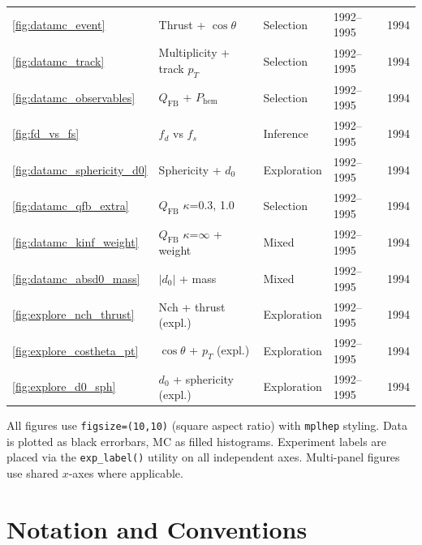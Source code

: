 \documentclass[11pt,a4paper]{article}
\begin{document}
\begin{table}[htbp]
\begin{tabular}{p{1.0cm}p{5.5cm}p{2.0cm}p{2.5cm}p{2.0cm}}
\ref{fig:datamc_event} & Thrust + $\cos\theta$ & Selection & 1992--1995 & 1994 \\
\ref{fig:datamc_track} & Multiplicity + track $p_T$ & Selection & 1992--1995 & 1994 \\
\ref{fig:datamc_observables} & $Q_\text{FB}$ + $P_\text{hem}$ & Selection & 1992--1995 & 1994 \\
\ref{fig:fd_vs_fs} & $f_d$ vs $f_s$ & Inference & 1992--1995 & 1994 \\
\ref{fig:datamc_sphericity_d0} & Sphericity + $d_0$ & Exploration & 1992--1995 & 1994 \\
\ref{fig:datamc_qfb_extra} & $Q_\text{FB}$ $\kappa$=0.3, 1.0 & Selection & 1992--1995 & 1994 \\
\ref{fig:datamc_kinf_weight} & $Q_\text{FB}$ $\kappa$=$\infty$ + weight & Mixed & 1992--1995 & 1994 \\
\ref{fig:datamc_absd0_mass} & $|d_0|$ + mass & Mixed & 1992--1995 & 1994 \\
\ref{fig:explore_nch_thrust} & Nch + thrust (expl.) & Exploration & 1992--1995 & 1994 \\
\ref{fig:explore_costheta_pt} & $\cos\theta$ + $p_T$ (expl.) & Exploration & 1992--1995 & 1994 \\
\ref{fig:explore_d0_sph} & $d_0$ + sphericity (expl.) & Exploration & 1992--1995 & 1994 \\
\bottomrule
\end{tabular}
\end{table}

All figures use \texttt{figsize=(10,10)} (square aspect ratio)
with \texttt{mplhep} styling.
Data is plotted as black errorbars, MC as filled histograms.
Experiment labels are placed via the \texttt{exp\_label()} utility
on all independent axes.
Multi-panel figures use shared $x$-axes where applicable.

\section{Notation and Conventions}
\label{app:notation}
\end{document}
